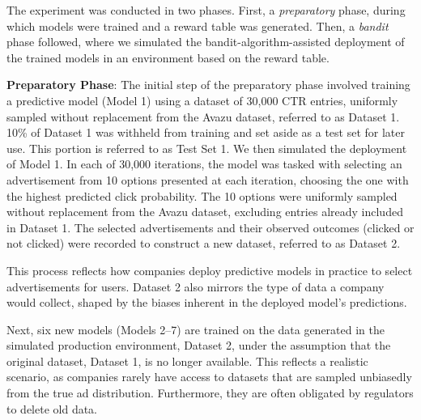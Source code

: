  The experiment was conducted in two phases. First, a \textit{preparatory} phase, during which models were trained and a reward table was generated. Then, a \textit{bandit} phase followed, where we simulated the bandit-algorithm-assisted deployment of the trained models in an environment based on the reward table.  
 
\textbf{Preparatory Phase}: 
The initial step of the preparatory phase involved training a predictive model (Model 1) using a dataset of 30,000 CTR entries, uniformly sampled without replacement from the Avazu dataset, referred to as Dataset 1. 10\% of Dataset 1 was withheld from training and set aside as a test set for later use. This portion is referred to as Test Set 1. We then simulated the deployment of Model 1. In each of 30,000 iterations, the model was tasked with selecting an advertisement from 10 options presented at each iteration, choosing the one with the highest predicted click probability. The 10 options were uniformly sampled without replacement from the Avazu dataset, excluding entries already included in Dataset 1. The selected advertisements and their observed outcomes (clicked or not clicked) were recorded to construct a new dataset, referred to as Dataset 2.

This process reflects how companies deploy predictive models in practice to select advertisements for users. Dataset 2 also mirrors the type of data a company would collect, shaped by the biases inherent in the deployed model’s predictions.

Next, six new models (Models 2–7) are trained on the data generated in the simulated production environment, Dataset 2, under the assumption that the original dataset, Dataset 1, is no longer available. This reflects a realistic scenario, as companies rarely have access to datasets that are sampled unbiasedly from the true ad distribution. Furthermore, they are often obligated by regulators to delete old data.


